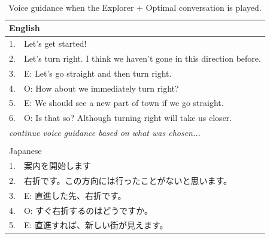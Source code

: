 \begin{table}[h]
    \centering
    \caption{Voice guidance when the Explorer + Optimal conversation is played.}~\label{tab:b-EO}
    \begin{tabular}{ll}
        \hline
        \multicolumn{2}{l}{English}                                                                           \\ \hline
        1.                      & Let's get started!                                                          \\
        2.                      & Let's turn right. I think we haven't gone in this direction before.         \\ \hline
        \multicolumn{1}{|l}{3.} & \multicolumn{1}{l|}{E: Let's go straight and then turn right.}              \\
        \multicolumn{1}{|l}{4.} & \multicolumn{1}{l|}{O: How about we immediately turn right?}                \\
        \multicolumn{1}{|l}{5.} & \multicolumn{1}{l|}{E: We should see a new part of town if we go straight.} \\
        \multicolumn{1}{|l}{6.} & \multicolumn{1}{l|}{O: Is that so? Although turning right will take us closer.}                \\ \hline
        \multicolumn{2}{l}{\textit{continue voice guidance based on what was chosen...}}                      \\
                                &                                                                             \\ \hline
        \multicolumn{2}{l}{Japanese}                                                                          \\ \hline
        1.                      & 案内を開始します                                                                    \\
        2.                      & 右折です。この方向には行ったことがないと思います。                                                   \\ \hline
        \multicolumn{1}{|l}{3.} & \multicolumn{1}{l|}{E: 直進した先、右折です。}                                         \\
        \multicolumn{1}{|l}{4.} & \multicolumn{1}{l|}{O: すぐ右折するのはどうですか。}                                      \\
        \multicolumn{1}{|l}{5.} & \multicolumn{1}{l|}{E: 直進すれば、新しい街が見えます。}                                    \\

\end{tabular}
\end{table}

